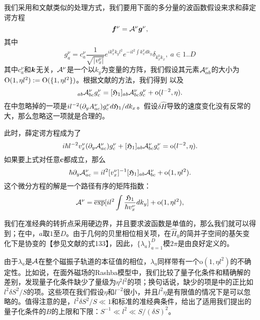 \begin{appendices}
我们采用和文献类似的处理方式，我们要用下面的多分量的波函数假设来求和薛定谔方程
\begin{equation}
\boldsymbol{f}^\nu={\cal A}^\nu\boldsymbol{g}^\nu,\label{wkb-wf}
\end{equation}
其中
\begin{equation}
g_a^\nu=c_{a}^\nu\frac{1}{\sqrt{|v_x^\nu|}}e^{ik^{0}_{x}k_{y}l^{2}}e^{-il^{2}\int k_{x}^\nu dk_{y}}\delta_{k^{0}_{x}k_{x}},~a\in{1..D}
\end{equation}
其中$c_a^\nu$和$\boldsymbol{k}$无关，${\cal A}^\nu$是一个以$k_y$为变量的方阵，我们假设其元素${\cal A}_{ab}^\nu$的大小为$\text{O}(1, \eta l^2):=\text{O}(\{1,\eta l^2\})$。根据文献的方法，我们得到
以及
\begin{equation}
[\effH_{1}(\bK)]_{ab}\A_{bc}^\nu g_{c}^\nu=[\effH_{1}]_{ab}\A_{bc}^\nu g_{c}^\nu+\text{o}(l^{-2}, \eta).\label{effH1onA}
\end{equation}
在中忽略掉的一项是$i l^{-2}(\partial_{y}A_{ac}^\nu)g_{c}^\nu d\mathfrak{H}_1/dk_x$。假设$\delta\hat{H}$导致的速度变化没有反常的大，那么忽略这一项就是合理的。

此时，薛定谔方程成为了 
\begin{equation}
i\hbar l^{-2} v_{x}^\nu (\partial_{y}{\cal A}_{ac}^\nu)  g_{c}^\nu+[\mathfrak{H}_{1}]_{ab}{\cal A}_{bc}^\nu g_{c}^\nu=\text{o}(l^{-2}, \eta).
\end{equation}
如果要上式对任意$\mathbf{c}$都成立，那么
\begin{equation}
\hbar\partial_{y}{\cal A}_{ac}^\nu=il^{2}[v_{x}^\nu]^{-1}[\mathfrak{H}_{1}]_{ab}{\cal A}_{bc}^\nu+{\text{o}(1, \eta l^2)}.
\end{equation}
这个微分方程的解是一个路径有序的矩阵指数：
\begin{equation}
{\cal A}^\nu=\overline{\exp}[il^{2}\int\frac{\mathfrak{H}_{1}}{\hbar v_{x}^\nu}dk_{y}]+{\text{o}(1, \eta l^2)},
\end{equation}

我们在准经典的转折点采用硬边界，并且要求波函数是单值的\cite{100p}，那么我们就可以得到；在中，$a$取$1$至$D$。由于几何的贝里相位相关项，在$\hat{H}_0$的简并子空间的基矢变化下是协变的【参见文献的式133】，因此，$\{\lambda_a\}_{a=1}^D$模$2\pi$是由良好定义的。

由于$\lambda_a$是${\cal A}$在整个磁振子轨道的本征值的相位，$\lambda_a$同样带有一个$\text{o}(1, \eta l^2)$的不确定性。比如说，在面外磁场的Rashba模型中，我们比较了量子化条件和精确解的差别，发现量子化条件缺少了量级为$\eta^2 l^2$的项；换句话说，缺少的项是中的正比如 $l^2\delta S^2/S$的项。这些项在我们假设$\eta$和$l^{-2}$很小，并且$l^2\eta$是有限值的情况下是可以忽略的。值得注意的是，$l^2\delta S^2/S\ll 1$和标准的准经典条件，给出了适用我们提出的量子化条件的$B$的上限和下限：$S^{-1} \ll l^2 \ll S/(\delta S)^2$。



\end{appendices}
